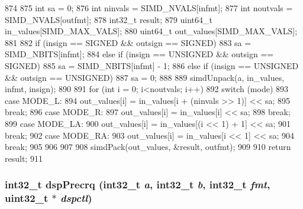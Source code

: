 \begin{DoxyCode}
874 {
875     int sa = 0;
876     int ninvals = SIMD_NVALS[infmt];
877     int noutvals = SIMD_NVALS[outfmt];
878     int32_t result;
879     uint64_t in_values[SIMD_MAX_VALS];
880     uint64_t out_values[SIMD_MAX_VALS];
881 
882     if (insign == SIGNED && outsign == SIGNED)
883       sa = SIMD_NBITS[infmt];
884     else if (insign == UNSIGNED && outsign == SIGNED)
885       sa = SIMD_NBITS[infmt] - 1;
886     else if (insign == UNSIGNED && outsign == UNSIGNED)
887       sa = 0;
888 
889     simdUnpack(a, in_values, infmt, insign);
890 
891     for (int i = 0; i<noutvals; i++) {
892         switch (mode) {
893           case MODE_L:
894             out_values[i] = in_values[i + (ninvals >> 1)] << sa;
895             break;
896           case MODE_R:
897             out_values[i] = in_values[i] << sa;
898             break;
899           case MODE_LA:
900             out_values[i] = in_values[(i << 1) + 1] << sa;
901             break;
902           case MODE_RA:
903             out_values[i] = in_values[i << 1] << sa;
904             break;
905         }
906     }
907 
908     simdPack(out_values, &result, outfmt);
909 
910     return result;
911 }
\end{DoxyCode}
\hypertarget{namespaceMipsISA_ae9f8befb1c44a3f87e10ef57ff3cd94f}{
\subsubsection[{dspPrecrq}]{\setlength{\rightskip}{0pt plus 5cm}int32\_\-t dspPrecrq (int32\_\-t {\em a}, \/  int32\_\-t {\em b}, \/  int32\_\-t {\em fmt}, \/  {\bf uint32\_\-t} $\ast$ {\em dspctl})}}
\label{namespaceMipsISA_ae9f8befb1c44a3f87e10ef57ff3cd94f}



